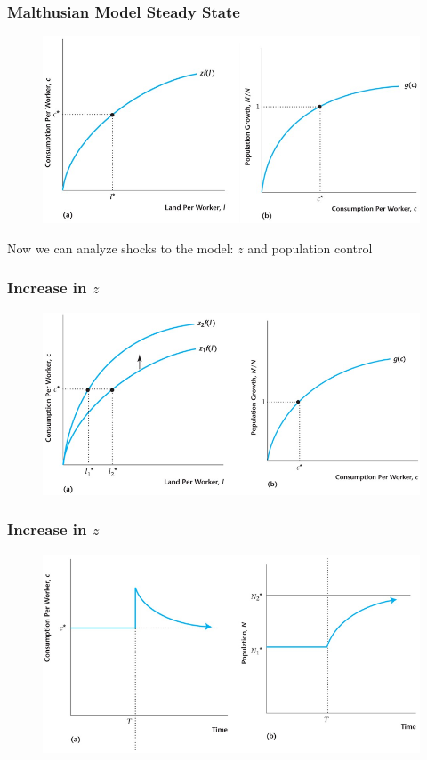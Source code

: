 \documentclass{beamer}
\begin{document}
\begin{frame}
\frametitle[alignment=center]{Malthusian Model Steady State}
\begin{figure}
\centering
\includegraphics[scale=0.5]{Figures/W_Fig_7pt8.png}
\end{figure}
Now we can analyze shocks to the model: $z$ and population control
\end{frame}



\begin{frame}
\frametitle[alignment=center]{Increase in $z$}
\begin{figure}
\centering
\includegraphics[scale=0.5]{Figures/W_Fig_7pt9.png}
\end{figure}
\end{frame}



\begin{frame}
\frametitle[alignment=center]{Increase in $z$}
\begin{figure}
\centering
\includegraphics[scale=0.5]{Figures/W_Fig_7pt10.png}
\end{figure}
\end{frame}
\end{document}
